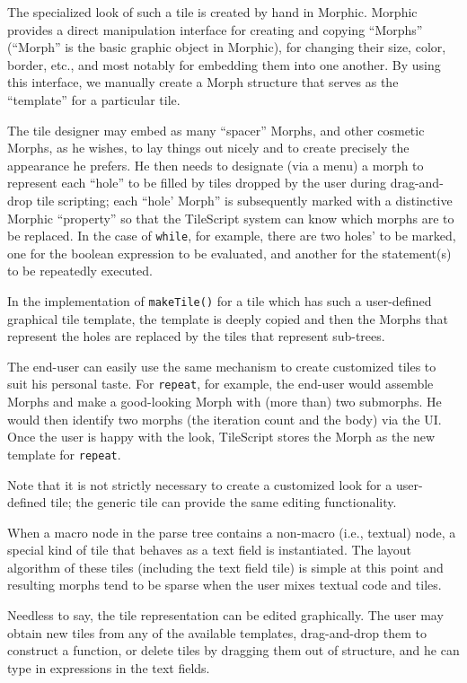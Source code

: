   The specialized look of such a tile is created by hand in Morphic.
Morphic provides a direct manipulation interface for creating and
copying ``Morphs'' (``Morph'' is the basic graphic object in Morphic), for changing
their size, color, border, etc., and most notably for embedding them into
one another.  By using this interface, we manually create a Morph structure
that serves as the ``template'' for a particular tile.

  The tile designer may embed as many ``spacer'' Morphs, and other cosmetic Morphs, as he wishes, to lay
things out nicely and to create precisely the appearance he prefers.  He then needs to designate (via a menu) a morph to represent each ``hole'' to be
filled by tiles dropped by the user during drag-and-drop tile scripting; each  ``hole' Morph'' is subsequently marked with a distinctive Morphic  ``property'' so that the TileScript
system can know which morphs are to be replaced.  In the case of {\tt while}, for example, there are two holes' to be marked, one for the boolean expression to be evaluated, and another for the statement(s) to be repeatedly executed.

  In the implementation of {\tt makeTile()} for a tile which has such a user-defined
graphical tile template, the template is deeply copied and then
the Morphs that represent the holes are replaced by the tiles that represent
sub-trees.

  The end-user can easily use the same mechanism to create customized tiles to suit his personal taste.  For {\tt repeat}, for
example, the end-user would assemble Morphs and make a good-looking
Morph with (more than) two submorphs.  He would then identify two
morphs (the iteration count and the body) via the UI.  Once the user
is happy with the look, TileScript stores the Morph as the new
template for {\tt repeat}.

  Note that it is not strictly necessary to create a customized look for
a user-defined tile; the generic tile can provide the same editing
functionality.

  When a macro node in the parse tree contains a non-macro (i.e.,
textual) node, a special kind of tile that behaves as a text field is
instantiated.  The layout algorithm of these tiles (including the text
field tile) is simple at this point and resulting morphs tend to be
sparse when the user mixes textual code and tiles.

  Needless to say, the tile representation can be edited graphically.
The user may obtain new tiles from any of the available
templates, drag-and-drop them to construct a function, or delete
tiles by dragging them out of structure, and he can type in expressions in the text
fields.

